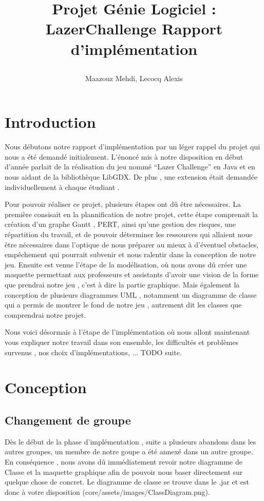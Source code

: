 \documentclass[a4paper,10pt]{article}
\title{
    \begin{minipage}\linewidth
        \centering\bfseries\sffamily
        Projet Génie Logiciel : LazerChallenge
        \vskip3pt
        \large Rapport d'implémentation
    \end{minipage}
    }
\author{Maazouz Mehdi, Lecocq Alexis}
\begin{document}
\maketitle

\section{Introduction}
Nous débutons notre rapport d'implémentation par un léger rappel du projet qui nous a été demandé initialement. 
L'énoncé mis à notre disposition en début d'année parlait de la réalisation du jeu nommé ``Lazer Challenge'' en Java
et en nous aidant de la bibliothèque LibGDX. De plus , une extension était demandée individuellement à chaque étudiant .

Pour pouvoir réaliser ce projet, plusieurs étapes ont dû être nécessaires. La première consisait en la plannification de notre projet,
 cette étape comprenait la création d'un graphe Gantt , PERT, ainsi qu'une gestion des risques, une répartition du travail,
  et de pouvoir déterminer les ressources qui allaient noue être nécessaires dans l'optique de nous préparer au mieux à d'éventuel
 obstacles, empêchement qui pourrait subvenir et nous ralentir dans la conception de notre jeu. Ensuite est venue l'étape de la modélisation, où nous
 avons dû créer une maquette permettant aux professeurs et assistants d'avoir une vision de la forme que prendrai notre jeu , c'est à dire la partie graphique.
 Mais également la conception de plusieurs diagrammes UML , notamment un diagramme de classe qui a permis de montrer le fond de notre jeu , autrement dit les classes
 que comprendrai notre projet.
 
 Nous voici désormais à l'étape de l'implémentation où nous allont maintenant vous expliquer notre travail dans son ensemble,
 les difficultés et problèmes survenus , nos choix d'implémentations, ... TODO suite.
 
\section{Conception}
\subsection{Changement de groupe}
Dès le début de la phase d'implémentation , suite a plusieurs abandons dans les autres groupes, un membre de notre goupe a été annexé dans un autre groupe.
En conséquence , nous avons dû immédiatement revoir notre diagramme de Classe et la maquette graphique afin de pouvoir nous baser directement sur quelque chose
de concret. Le diagramme de classe se trouve dans le .jar et est donc à votre disposition (core/assets/images/ClassDiagram.png).
\end{document}
